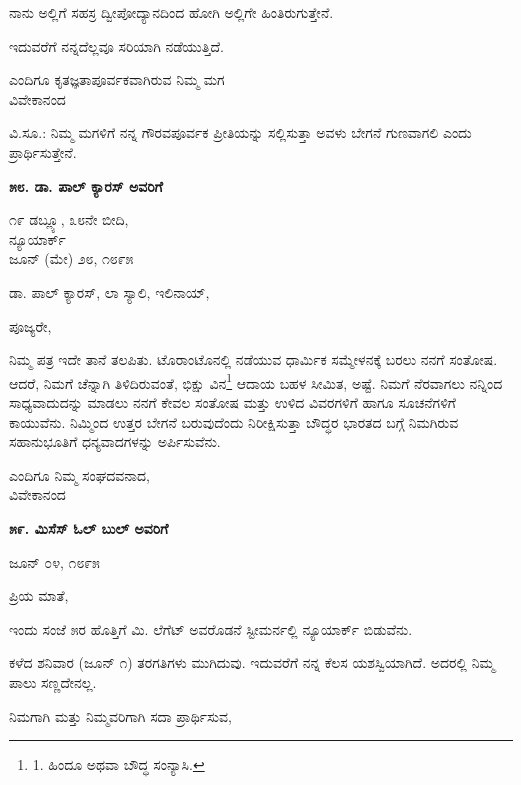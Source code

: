 ನಾನು ಅಲ್ಲಿಗೆ ಸಹಸ್ರ ದ್ವೀಪೋದ್ಯಾನದಿಂದ ಹೋಗಿ ಅಲ್ಲಿಗೇ ಹಿಂತಿರುಗುತ್ತೇನೆ.

ಇದುವರೆಗೆ ನನ್ನದೆಲ್ಲವೂ ಸರಿಯಾಗಿ ನಡೆಯುತ್ತಿದೆ.

\begin{flushright}
ಎಂದಿಗೂ ಕೃತಜ್ಞತಾಪೂರ್ವಕವಾಗಿರುವ ನಿಮ್ಮ ಮಗ\\ವಿವೇಕಾನಂದ
\end{flushright}

ವಿ.ಸೂ.: ನಿಮ್ಮ ಮಗಳಿಗೆ ನನ್ನ ಗೌರವಪೂರ್ವಕ ಪ್ರೀತಿಯನ್ನು ಸಲ್ಲಿಸುತ್ತಾ ಅವಳು ಬೇಗನೆ ಗುಣವಾಗಲಿ ಎಂದು ಪ್ರಾರ್ಥಿಸುತ್ತೇನೆ.

\begin{center}
\textbf{೫೮. ಡಾ. ಪಾಲ್ ಕ್ಯಾರಸ್ ಅವರಿಗೆ}
\end{center}

\begin{flushright}
೧೯ ಡಬ್ಲ್ಯೂ, ೩೮ನೇ ಬೀದಿ,\\ನ್ಯೂಯಾರ್ಕ್\\ಜೂನ್ (ಮೇ) ೨೮, ೧೮೯೫
\end{flushright}

ಡಾ. ಪಾಲ್ ಕ್ಯಾರಸ್, ಲಾ ಸ್ಯಾಲಿ, ಇಲಿನಾಯ್​,

ಪೂಜ್ಯರೇ,

ನಿಮ್ಮ ಪತ್ರ ಇದೇ ತಾನೆ ತಲಪಿತು. ಟೊರಾಂಟೊನಲ್ಲಿ ನಡೆಯುವ ಧಾರ್ಮಿಕ ಸಮ್ಮೇಳನಕ್ಕೆ ಬರಲು ನನಗೆ ಸಂತೋಷ. ಆದರೆ, ನಿಮಗೆ ಚೆನ್ನಾಗಿ ತಿಳಿದಿರುವಂತೆ, ಭಿಕ್ಷು ವಿನ\footnote{1. ಹಿಂದೂ ಅಥವಾ ಬೌದ್ಧ ಸಂನ್ಯಾಸಿ.} ಆದಾಯ ಬಹಳ ಸೀಮಿತ, ಅಷ್ಟೆ. ನಿಮಗೆ ನೆರವಾಗಲು ನನ್ನಿಂದ ಸಾಧ್ಯವಾದುದನ್ನು ಮಾಡಲು ನನಗೆ ಕೇವಲ ಸಂತೋಷ ಮತ್ತು ಉಳಿದ ವಿವರಗಳಿಗೆ ಹಾಗೂ ಸೂಚನೆಗಳಿಗೆ ಕಾಯುವೆನು. ನಿಮ್ಮಿಂದ ಉತ್ತರ ಬೇಗನೆ ಬರುವುದೆಂದು ನಿರೀಕ್ಷಿಸುತ್ತಾ ಬೌದ್ಧರ ಭಾರತದ ಬಗ್ಗೆ ನಿಮಗಿರುವ ಸಹಾನುಭೂತಿಗೆ ಧನ್ಯವಾದಗಳನ್ನು ಅರ್ಪಿಸುವೆನು.

\begin{flushright}
ಎಂದಿಗೂ ನಿಮ್ಮ ಸಂಘದವನಾದ,\\ವಿವೇಕಾನಂದ
\end{flushright}

\begin{center}
\textbf{೫೯. ಮಿಸೆಸ್ ಓಲ್ ಬುಲ್ ಅವರಿಗೆ}
\end{center}

\begin{flushright}
ಜೂನ್ ೦೪, ೧೮೯೫
\end{flushright}

ಪ್ರಿಯ ಮಾತೆ,

ಇಂದು ಸಂಜೆ ೫ರ ಹೊತ್ತಿಗೆ ಮಿ. ಲೆಗೆಟ್ ಅವರೊಡನೆ ಸ್ಟೀಮರ್ನಲ್ಲಿ ನ್ಯೂಯಾರ್ಕ್ ಬಿಡುವೆನು.

ಕಳೆದ ಶನಿವಾರ (ಜೂನ್ ೧) ತರಗತಿಗಳು ಮುಗಿದುವು. ಇದುವರೆಗೆ ನನ್ನ ಕೆಲಸ ಯಶಸ್ವಿಯಾಗಿದೆ. ಅದರಲ್ಲಿ ನಿಮ್ಮ ಪಾಲು ಸಣ್ಣದೇನಲ್ಲ.

ನಿಮಗಾಗಿ ಮತ್ತು ನಿಮ್ಮವರಿಗಾಗಿ ಸದಾ ಪ್ರಾರ್ಥಿಸುವ,

